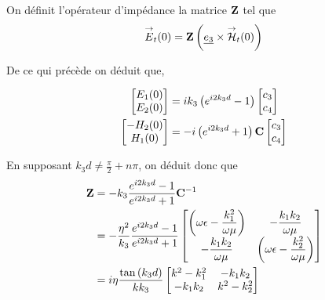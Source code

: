On définit l'opérateur d'impédance la matrice $\mathbf{Z}$ tel que 
\begin{equation}
    {\overset{\rightarrow}{E}}_t(0) = \mathbf{Z} \left(\underline{e_3} \times {\overset{\rightarrow}{\mathcal{H}}}_t(0)\right)
\end{equation}

De ce qui précède on déduit que,

\begin{align}
    \begin{bmatrix}
        E_1(0)\\
        E_2(0)\\
    \end{bmatrix}
    &=ik_3\left( e^{i2k_3 d} -1 \right)
    \begin{bmatrix}
        c_3 \\
        c_4
    \end{bmatrix} \\
    \begin{bmatrix}
        -H_2(0)\\
        H_1(0)\\
    \end{bmatrix}
    & = - i\left(e^{i2k_3 d} +1 \right)
    \mathbf{C}
    \begin{bmatrix}
    c_3 \\
    c_4
    \end{bmatrix}
\end{align}

En supposant $k_3d \not = \frac{\pi}{2} + n\pi$, on déduit donc que
\begin{align}
    \mathbf{Z} &=  - k_3 \dfrac{e^{i2k_3d} -1}{e^{i2k_3d} +1} \mathbf{C}^{-1} 
    \\
    &= -\dfrac{\eta^2}{k_3} \dfrac{e^{i2k_3d} -1}{e^{i2k_3d} +1}
        \begin{bmatrix}
           \left(\omega\epsilon-\dfrac{k_1^2}{\omega\mu}\right)  & -\dfrac{k_1k_2}{\omega\mu}\\
            -\dfrac{k_1k_2}{\omega\mu} &  \left(\omega\epsilon-\dfrac{k_2^2}{\omega\mu}\right)
        \end{bmatrix}
    \\
    &= i\eta\dfrac{\tan\left(k_3d\right)}{kk_3}
        \begin{bmatrix}
           k^2-k_1^2  & -k_1k_2\\
            -k_1k_2 & k^2-k_2^2\\
        \end{bmatrix}
\end{align}


